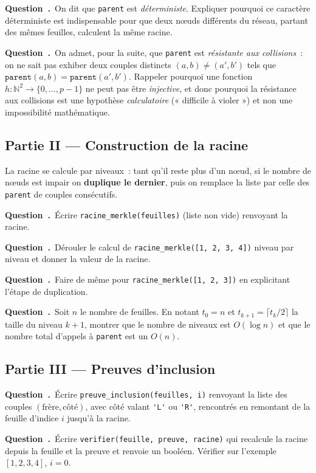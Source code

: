 \documentclass[11pt,a4paper]{article}
\newcounter{qcnt}
\newcommand{\Q}{\medskip\par\stepcounter{qcnt}\noindent\textbf{Question~\theqcnt.}~}
\newcommand{\code}[1]{\lstinline!#1!}
\begin{document}
\Q On dit que \code{parent} est \emph{déterministe}. Expliquer pourquoi ce caractère déterministe
est indispensable pour que deux n\oe uds différents du réseau, partant des mêmes feuilles,
calculent la même racine.

\Q On admet, pour la suite, que \code{parent} est \emph{résistante aux collisions}~: on ne sait
pas exhiber deux couples distincts $(a,b)\neq(a',b')$ tels que $\mathtt{parent}(a,b)=
\mathtt{parent}(a',b')$. Rappeler pourquoi une fonction $h : \mathbb{N}^2 \to \{0,\dots,p-1\}$ ne
peut pas être \emph{injective}, et donc pourquoi la résistance aux collisions est une hypothèse
\emph{calculatoire} (« difficile à violer ») et non une impossibilité mathématique.

\subsection*{Partie II --- Construction de la racine}

La racine se calcule par niveaux~: tant qu'il reste plus d'un n\oe ud, si le nombre de n\oe uds
est impair on \textbf{duplique le dernier}, puis on remplace la liste par celle des
\code{parent} de couples consécutifs.

\Q Écrire \code{racine_merkle(feuilles)} (liste non vide) renvoyant la racine.

\Q Dérouler le calcul de \code{racine_merkle([1, 2, 3, 4])} niveau par niveau et donner la valeur
de la racine.

\Q Faire de même pour \code{racine_merkle([1, 2, 3])} en explicitant l'étape de duplication.

\Q Soit $n$ le nombre de feuilles. En notant $t_0=n$ et $t_{k+1}=\lceil t_k/2\rceil$ la taille du
niveau $k+1$, montrer que le nombre de niveaux est $O(\log n)$ et que le nombre total d'appels à
\code{parent} est un $O(n)$.

\subsection*{Partie III --- Preuves d'inclusion}

\Q Écrire \code{preuve_inclusion(feuilles, i)} renvoyant la liste des couples
$(\text{frère}, \text{côté})$, avec côté valant \code{'L'} ou \code{'R'}, rencontrés en remontant
de la feuille d'indice $i$ jusqu'à la racine.

\Q Écrire \code{verifier(feuille, preuve, racine)} qui recalcule la racine depuis la feuille et
la preuve et renvoie un booléen. Vérifier sur l'exemple $[1,2,3,4]$, $i=0$.
\end{document}
